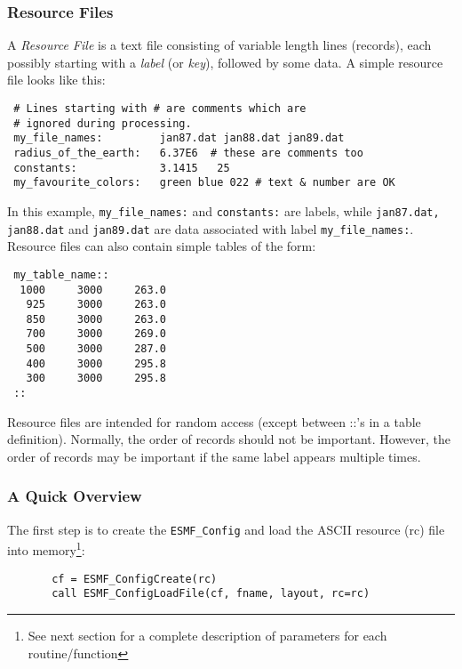 
 \subsubsection{Resource Files}

      A {\em Resource File} is a text file consisting of variable
     length lines (records), each possibly starting with a {\em label}
     (or {\em key}), followed by some data. A simple resource file 
     looks like this:

 \begin{verbatim}
 # Lines starting with # are comments which are
 # ignored during processing.
 my_file_names:         jan87.dat jan88.dat jan89.dat
 radius_of_the_earth:   6.37E6  # these are comments too
 constants:             3.1415   25
 my_favourite_colors:   green blue 022 # text & number are OK
 \end{verbatim}

    In this example, {\tt my\_file\_names:} and {\tt constants:}
    are labels, while {\tt jan87.dat, jan88.dat} and {\tt jan89.dat} are
    data associated with label {\tt my\_file\_names:}.
    Resource files can also contain simple tables of the form:

 \begin{verbatim}
 my_table_name::
  1000     3000     263.0   
   925     3000     263.0
   850     3000     263.0
   700     3000     269.0
   500     3000     287.0
   400     3000     295.8
   300     3000     295.8    
 ::
 \end{verbatim}

 Resource files are intended for random access (except between ::'s in a 
 table definition). Normally, the order of records should not be important. 
 However, the order of records may be important if the same label appears 
 multiple times.

    \subsubsection{A Quick Overview}

    The first step is to create the {\tt ESMF\_Config} and load the 
    ASCII resource (rc) file into memory\footnote{See next section 
    for a complete description of parameters for each routine/function}:

 \begin{verbatim}
       cf = ESMF_ConfigCreate(rc)
       call ESMF_ConfigLoadFile(cf, fname, layout, rc=rc)
 \end{verbatim}

